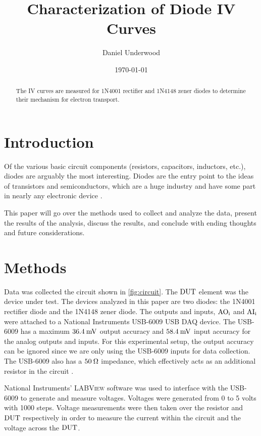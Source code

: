 \documentclass[reprint]{revtex4-1}
\begin{document}
\title{Characterization of Diode IV Curves}
\author{Daniel Underwood}
\date{\today}

\begin{abstract}

The IV curves are measured for \textsc{1N4001} rectifier and \textsc{1N4148} zener diodes to determine their mechanism for electron transport.

\end{abstract}
\maketitle

\section{Introduction}

Of the various basic circuit components (resistors, capacitors, inductors, etc.), diodes are arguably the most interesting. Diodes are the entry point to the ideas of transistors and semiconductors, which are a huge industry and have some part in nearly any electronic device \cite{Ross1998}.

This paper will go over the methods used to collect and analyze the data, present the results of the analysis, discuss the results, and conclude with ending thoughts and future considerations.

\section{Methods}

Data was collected the circuit shown in \cref{fig:circuit}. The $\rm{DUT}$ element was the device under test. The devices analyzed in this paper are two diodes: the \textsc{1N4001} rectifier diode and the \textsc{1N4148} zener diode. The outputs and inputs, $\rm{AO}_i$ and $\rm{AI}_i$ were attached to a National Instruments USB-6009 USB DAQ device. The USB-6009 has a maximum $36.4\:\rm{mV}$ output accuracy and $58.4\:\rm{mV}$ input accuracy for the analog outputs and inputs. For this experimental setup, the output accuracy can be ignored since we are only using the USB-6009 inputs for data collection. The USB-6009 also has a $50\:\rm{\Omega}$ impedance, which effectively acts as an additional resistor in the circuit \cite{Instruments2014}. 

National Instruments' \textsc{LABView} software was used to interface with the USB-6009 to generate and measure voltages. Voltages were generated from 0 to 5 volts with 1000 steps. Voltage measurements were then taken over the resistor and $\rm{DUT}$ respectively in order to measure the current within the circuit and the voltage across the $\rm{DUT}$.
\end{document}
